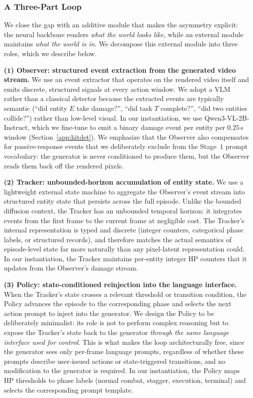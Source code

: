 \subsubsection{A Three-Part Loop}
\label{app:otp_loop}

We close the gap with an additive module that makes the asymmetry explicit: the neural backbone renders \emph{what the world looks like}, while an external module maintains \emph{what the world is in}. We decompose this external module into three roles, which we describe below.

\textbf{($\mathbf{1}$) Observer: structured event extraction from the generated video stream.}
We use an event extractor that operates on the rendered video itself and emits discrete, structured signals at every action window. We adopt a VLM rather than a classical detector because the extracted events are typically semantic (``did entity $E$ take damage?'', ``did task $T$ complete?'', ``did two entities collide?'') rather than low-level visual. In our instantiation, we use Qwen3-VL-$2$B-Instruct, which we fine-tune to emit a binary damage event per entity per $0.25$\,s window (Section~\ref{app:hitdet}). We emphasize that the Observer also compensates for passive-response events that we deliberately exclude from the Stage~$1$ prompt vocabulary: the generator is never conditioned to produce them, but the Observer reads them back off the rendered pixels.

\textbf{($\mathbf{2}$) Tracker: unbounded-horizon accumulation of entity state.}
We use a lightweight external state machine to aggregate the Observer's event stream into structured entity state that persists across the full episode. Unlike the bounded diffusion context, the Tracker has an unbounded temporal horizon: it integrates events from the first frame to the current frame at negligible cost. The Tracker's internal representation is typed and discrete (integer counters, categorical phase labels, or structured records), and therefore matches the actual semantics of episode-level state far more naturally than any pixel-latent representation could. In our instantiation, the Tracker maintains per-entity integer HP counters that it updates from the Observer's damage stream.

\textbf{($\mathbf{3}$) Policy: state-conditioned reinjection into the language interface.}
When the Tracker's state crosses a relevant threshold or transition condition, the Policy advances the episode to the corresponding phase and selects the next action prompt to inject into the generator. We design the Policy to be deliberately minimalist: its role is not to perform complex reasoning but to expose the Tracker's state back to the generator \emph{through the same language interface used for control}. This is what makes the loop architecturally free, since the generator sees only per-frame language prompts, regardless of whether these prompts describe user-issued actions or state-triggered transitions, and no modification to the generator is required. In our instantiation, the Policy maps HP thresholds to phase labels (normal combat, stagger, execution, terminal) and selects the corresponding prompt template.

